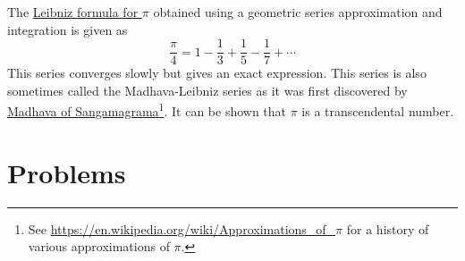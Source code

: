 The \href{https://en.wikipedia.org/wiki/Leibniz_formula_for_\%CF\%80}{Leibniz formula for $\pi$} obtained using a geometric series approximation and integration is given as
\[
\frac{\pi}{4} = 1 - \frac13 + \frac15 - \frac17 + \cdots
\]
This series converges slowly but gives an exact expression.  This series is also sometimes called the Madhava-Leibniz series as it was first discovered by \href{https://en.wikipedia.org/wiki/Madhava_of_Sangamagrama}{Madhava of Sangamagrama}\footnote{See \href{https://en.wikipedia.org/wiki/Approximations_of_\%CF\%80}{https://en.wikipedia.org/wiki/Approximations\_of\_$\pi$} for a history of various approximations of $\pi$.}. It can be shown that $\pi$ is a transcendental number.


\section*{Problems}


